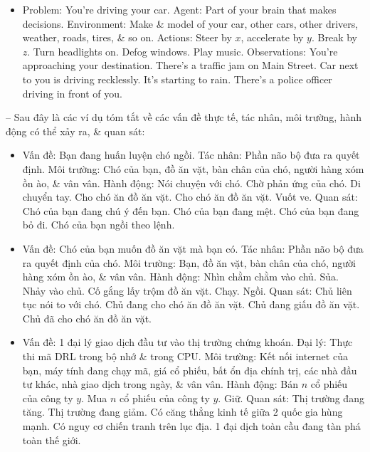 \documentclass{article}
\begin{document}
\begin{itemize}
\begin{itemize}
\begin{itemize}
\begin{itemize}
                \item Problem: You're driving your car. Agent: Part of your brain that makes decisions. Environment: Make \& model of your car, other cars, other drivers, weather, roads, tires, \& so on. Actions: Steer by $x$, accelerate by $y$. Break by $z$. Turn headlights on. Defog windows. Play music. Observations: You're approaching your destination. There's a traffic jam on Main Street. Car next to you is driving recklessly. It's starting to rain. There's a police officer driving in front of you.
            \end{itemize}
            -- Sau đây là các ví dụ tóm tắt về các vấn đề thực tế, tác nhân, môi trường, hành động có thể xảy ra, \& quan sát:
            \begin{itemize}
                \item Vấn đề: Bạn đang huấn luyện chó ngồi. Tác nhân: Phần não bộ đưa ra quyết định. Môi trường: Chó của bạn, đồ ăn vặt, bàn chân của chó, người hàng xóm ồn ào, \& vân vân. Hành động: Nói chuyện với chó. Chờ phản ứng của chó. Di chuyển tay. Cho chó ăn đồ ăn vặt. Cho chó ăn đồ ăn vặt. Vuốt ve. Quan sát: Chó của bạn đang chú ý đến bạn. Chó của bạn đang mệt. Chó của bạn đang bỏ đi. Chó của bạn ngồi theo lệnh.
                \item Vấn đề: Chó của bạn muốn đồ ăn vặt mà bạn có. Tác nhân: Phần não bộ đưa ra quyết định của chó. Môi trường: Bạn, đồ ăn vặt, bàn chân của chó, người hàng xóm ồn ào, \& vân vân. Hành động: Nhìn chằm chằm vào chủ. Sủa. Nhảy vào chủ. Cố gắng lấy trộm đồ ăn vặt. Chạy. Ngồi. Quan sát: Chủ liên tục nói to với chó. Chủ đang cho chó ăn đồ ăn vặt. Chủ đang giấu đồ ăn vặt. Chủ đã cho chó ăn đồ ăn vặt.

                \item Vấn đề: 1 đại lý giao dịch đầu tư vào thị trường chứng khoán. Đại lý: Thực thi mã DRL trong bộ nhớ \& trong CPU. Môi trường: Kết nối internet của bạn, máy tính đang chạy mã, giá cổ phiếu, bất ổn địa chính trị, các nhà đầu tư khác, nhà giao dịch trong ngày, \& vân vân. Hành động: Bán $n$ cổ phiếu của công ty $y$. Mua $n$ cổ phiếu của công ty $y$. Giữ. Quan sát: Thị trường đang tăng. Thị trường đang giảm. Có căng thẳng kinh tế giữa 2 quốc gia hùng mạnh. Có nguy cơ chiến tranh trên lục địa. 1 đại dịch toàn cầu đang tàn phá toàn thế giới.


\end{itemize}
\end{itemize}
\end{itemize}
\end{itemize}
\end{document}
